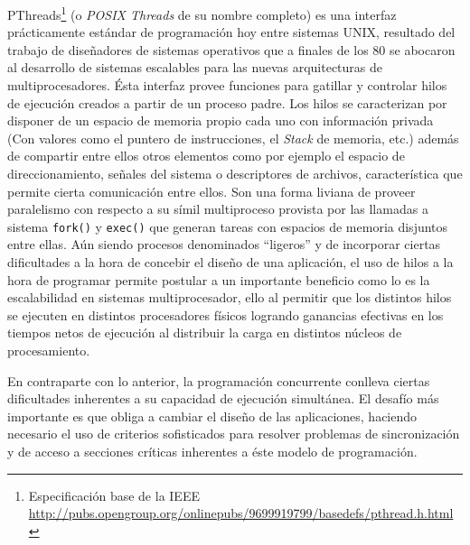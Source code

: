 PThreads\footnote{Especificación base de la IEEE \url{http://pubs.opengroup.org/onlinepubs/9699919799/basedefs/pthread.h.html}} (o \emph{POSIX Threads} de su nombre completo) es una interfaz prácticamente estándar de programación hoy entre sistemas UNIX, resultado del trabajo de diseñadores de sistemas operativos que a finales de los 80 se abocaron al desarrollo de sistemas escalables para las nuevas arquitecturas de multiprocesadores. Ésta interfaz provee funciones para gatillar y controlar hilos de ejecución creados a partir de un proceso padre. Los hilos se caracterizan por disponer de un espacio de memoria propio cada uno con información privada (Con valores como el puntero de instrucciones, el \emph{Stack} de memoria, etc.) además de compartir entre ellos otros elementos como  por ejemplo el espacio de direccionamiento, señales del sistema o descriptores de archivos, característica que permite cierta comunicación entre ellos. Son una forma liviana de proveer paralelismo con respecto a su símil multiproceso provista por las llamadas a sistema \verb=fork()= y \verb=exec()= que generan tareas con espacios de memoria disjuntos entre ellas. Aún siendo procesos denominados ``ligeros'' y de incorporar ciertas dificultades a la hora de concebir el diseño de una aplicación, el uso de hilos a la hora de programar permite postular a un importante beneficio como lo es la escalabilidad en sistemas multiprocesador, ello al permitir que los distintos hilos se ejecuten en distintos procesadores físicos logrando ganancias efectivas en los tiempos netos de ejecución al distribuir la carga en distintos núcleos de procesamiento.

En contraparte con lo anterior, la programación concurrente conlleva ciertas dificultades inherentes a su capacidad de ejecución simultánea. El desafío más importante es que obliga a cambiar el diseño de las aplicaciones, haciendo necesario el uso de criterios sofisticados para resolver problemas de sincronización y de acceso a secciones críticas inherentes a éste modelo de programación.


